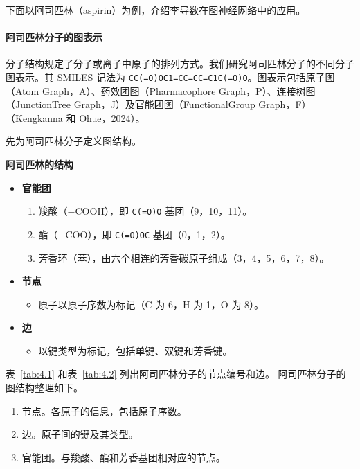 下面以阿司匹林（aspirin）为例，介绍李导数在图神经网络中的应用。

\paragraph{阿司匹林分子的图表示}
分子结构规定了分子或离子中原子的排列方式。我们研究阿司匹林分子的不同分子图表示。其 SMILES 记法为 \texttt{CC(=O)OC1=CC=CC=C1C(=O)O}。图表示包括原子图（Atom Graph，A）、药效团图（Pharmacophore Graph，P）、连接树图（JunctionTree Graph，J）及官能团图（FunctionalGroup Graph，F）（Kengkanna 和 Ohue，2024）。

先为阿司匹林分子定义图结构。

\textbf{阿司匹林的结构}
\begin{itemize}
  \item \textbf{官能团}
  \begin{enumerate}[label=\arabic*.]
    \item 羧酸（$-$COOH），即 \texttt{C(=O)O} 基团（9，10，11）。
    \item 酯（$-$COO），即 \texttt{C(=O)OC} 基团（0，1，2）。
    \item 芳香环（苯），由六个相连的芳香碳原子组成（3，4，5，6，7，8）。
  \end{enumerate}
  \item \textbf{节点}
  \begin{itemize}
    \item 原子以原子序数为标记（C 为 6，H 为 1，O 为 8）。
  \end{itemize}
  \item \textbf{边}
  \begin{itemize}
    \item 以键类型为标记，包括单键、双键和芳香键。
  \end{itemize}
\end{itemize}
表~\ref{tab:4.1} 和表~\ref{tab:4.2} 列出阿司匹林分子的节点编号和边。
阿司匹林分子的图结构整理如下。
\begin{enumerate}
  \item 节点。各原子的信息，包括原子序数。
  \item 边。原子间的键及其类型。
  \item 官能团。与羧酸、酯和芳香基团相对应的节点。
\end{enumerate}

